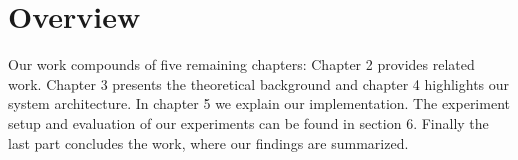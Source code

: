 
\section{Overview}

Our work compounds of five remaining chapters:
Chapter 2 provides related work. Chapter 3 presents the theoretical background and chapter 4 highlights our system architecture. In chapter 5 we explain our implementation. The experiment setup and evaluation of our experiments can be found in section 6. Finally the last part concludes the work, where our findings are summarized.